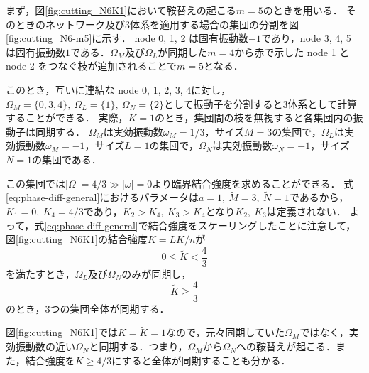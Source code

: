 \documentclass[../main]{subfiles}
\begin{document}
まず，図\ref{fig:cutting_N6K1}において鞍替えの起こる$m=5$のときを用いる．
そのときのネットワーク及び3体系を適用する場合の集団の分割を図\ref{fig:cutting_N6-m5}に示す．
node 0, 1, 2 は固有振動数$-1$であり，node 3, 4, 5 は固有振動数$1$である．$\Omega_M$及び$\Omega_L$が同期した$m=4$から赤で示した node 1 と node 2 をつなぐ枝が追加されることで$m=5$となる．

このとき，互いに連結な node 0, 1, 2, 3, 4に対し，$\Omega_M=\{0,3,4\},\ \Omega_L=\{1\},\ \Omega_N=\{2\}$として振動子を分割すると3体系として計算することができる．
実際，$K=1$のとき，集団間の枝を無視すると各集団内の振動子は同期する．
$\Omega_M$は実効振動数$\omega_M=1/3$，サイズ$M=3$の集団で，$\Omega_L$は実効振動数$\omega_M=-1$，サイズ$L=1$の集団で，$\Omega_N$は実効振動数$\omega_N=-1$，サイズ$N=1$の集団である．

この集団では$|\Omega|=4/3\gg|\omega|=0$より臨界結合強度を求めることができる．
式\eqref{eq:phase-diff-general}におけるパラメータは$a=1,\ \tilde{M}=3,\ \tilde{N}=1$であるから，
$K_1=0,\ K_4=4/3$であり，$K_2>K_4,\ K_3>K_4$となり$K_2,\ K_3$は定義されない．
よって，式\eqref{eq:phase-diff-general}で結合強度をスケーリングしたことに注意して，図\ref{fig:cutting_N6K1}の結合強度$K=L\tilde{K}/n$が
\begin{equation*}
    0\leq \tilde{K}<\frac{4}{3}
\end{equation*}
を満たすとき，$\Omega_L$及び$\Omega_N$のみが同期し，
\begin{equation*}
    \tilde{K}\geq \frac{4}{3}
\end{equation*}
のとき，3つの集団全体が同期する．

図\ref{fig:cutting_N6K1}では$K=\tilde{K}=1$なので，元々同期していた$\Omega_M$ではなく，実効振動数の近い$\Omega_N$と同期する．つまり，$\Omega_M$から$\Omega_N$への鞍替えが起こる．また，結合強度を$K\geq 4/3$にすると全体が同期することも分かる．
\end{document}
